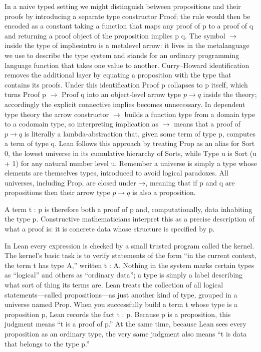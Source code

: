 \documentclass{article}
\newcommand{\1}{\mathbbm{1}}
\theoremstyle{plain}
\theoremstyle{definition}
\numberwithin{equation}{section}
\begin{document}
In a naive typed setting we might distinguish between propositions and their proofs by introducing a separate type constructor Proof; the rule would then be encoded as a constant taking a function that maps any proof of p to a proof of q and returning a proof object of the proposition implies p q. The symbol $\rightarrow$ inside the type of impliesintro is a metalevel arrow: it lives in the metalanguage we use to describe the type system and stands for an ordinary programming language function that takes one value to another. Curry–Howard identification removes the additional layer by equating a proposition with the type that contains its proofs. Under this identification Proof p collapses to p itself, which turns Proof p $\rightarrow$ Proof q into an object‑level arrow type $p\rightarrow q$ inside the theory; accordingly the explicit connective implies becomes unnecessary. In dependent type theory the arrow constructor $\rightarrow$ builds a function type from a domain type to a codomain type, so interpreting implication as $\rightarrow$ means that a proof of $p→q$ is literally a lambda‑abstraction that, given some term of type p, computes a term of type q. Lean follows this approach by treating Prop as an alias for Sort 0, the lowest universe in its cumulative hierarchy of Sorts, while Type u is Sort (u + 1) for any natural number level u. Remember a universe is simply a type whose elements are themselves types, introduced to avoid logical paradoxes. All universes, including Prop, are closed under →, meaning that if p and q are propositions then their arrow type $p→q$ is also a proposition. 

A term t : p is therefore both a proof of p and, computationally, data inhabiting the type p. Constructive mathematicians interpret this as a precise description of what a proof is: it is concrete data whose structure is specified by p. 

In Lean every expression is checked by a small trusted program called the kernel. The kernel’s basic task is to verify statements of the form “in the current context, the term t has type A,” written t : A. Nothing in the system marks certain types as “logical” and others as “ordinary data”; a type is simply a label describing what sort of thing its terms are. Lean treats the collection of all logical statements—called propositions—as just another kind of type, grouped in a universe named Prop. When you successfully build a term t whose type is a proposition p, Lean records the fact t : p. Because p is a proposition, this judgment means “t is a proof of p.” At the same time, because Lean sees every proposition as an ordinary type, the very same judgment also means “t is data that belongs to the type p.” 
\end{document}
